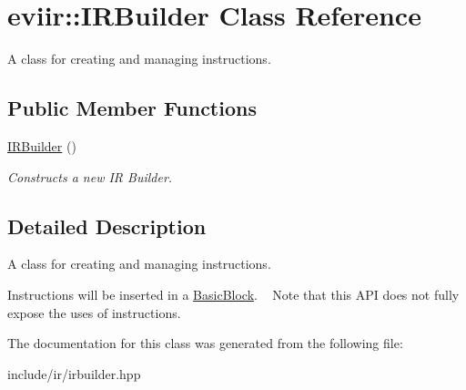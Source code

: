 \hypertarget{classeviir_1_1IRBuilder}{}\section{eviir\+:\+:I\+R\+Builder Class Reference}
\label{classeviir_1_1IRBuilder}


A class for creating and managing instructions.  


\subsection*{Public Member Functions}
\begin{DoxyCompactItemize}
\item 
\mbox{\label{classeviir_1_1IRBuilder_aaf6a6fb0af47e52dc6f2f16f90a7a62e}} 
\hyperlink{classeviir_1_1IRBuilder_aaf6a6fb0af47e52dc6f2f16f90a7a62e}{I\+R\+Builder} ()
\begin{DoxyCompactList}\small\item\em Constructs a new IR Builder. \end{DoxyCompactList}\end{DoxyCompactItemize}


\subsection{Detailed Description}
A class for creating and managing instructions. 

Instructions will be inserted in a \hyperlink{}{Basic\+Block}. ~\newline
Note that this A\+PI does not fully expose the uses of instructions. 

The documentation for this class was generated from the following file\+:\begin{DoxyCompactItemize}
\item 
include/ir/irbuilder.\+hpp\end{DoxyCompactItemize}
